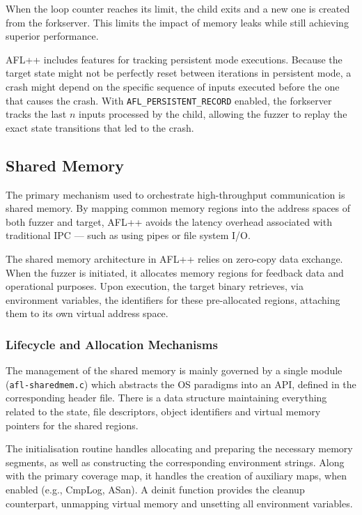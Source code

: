 When the loop counter reaches its limit, the child exits and a new one is created from the forkserver. This limits the impact of memory leaks while still achieving superior performance.

AFL++ includes features for tracking persistent mode executions. Because the target state might not be perfectly reset between iterations in persistent mode, a crash might depend on the specific sequence of inputs executed before the one that causes the crash. With \texttt{AFL\_PERSISTENT\_RECORD} enabled, the forkserver tracks the last $n$ inputs processed by the child, allowing the fuzzer to replay the exact state transitions that led to the crash.

\subsection{Shared Memory}
\label{sub:shm}

The primary mechanism used to orchestrate high-throughput communication is shared memory. By mapping common memory regions into the address spaces of both fuzzer and target, AFL++ avoids the latency overhead associated with traditional IPC --- such as using pipes or file system I/O.

The shared memory architecture in AFL++ relies on zero-copy data exchange. When the fuzzer is initiated, it allocates memory regions for feedback data and operational purposes. Upon execution, the target binary retrieves, via environment variables, the identifiers for these pre-allocated regions, attaching them to its own virtual address space.

\subsubsection{Lifecycle and Allocation Mechanisms}

The management of the shared memory is mainly governed by a single module (\texttt{afl-sharedmem.c}) which abstracts the OS paradigms into an API, defined in the corresponding header file. There is a data structure maintaining everything related to the state, file descriptors, object identifiers and virtual memory pointers for the shared regions.

The initialisation routine handles allocating and preparing the necessary memory segments, as well as constructing the corresponding environment strings. Along with the primary coverage map, it handles the creation of auxiliary maps, when enabled (e.g., CmpLog, ASan). A deinit function provides the cleanup counterpart, unmapping virtual memory and unsetting all environment variables.


